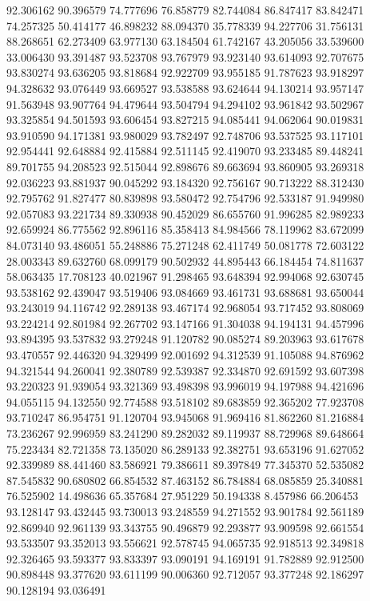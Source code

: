 92.306162
90.396579
74.777696
76.858779
82.744084
86.847417
83.842471
74.257325
50.414177
46.898232
88.094370
35.778339
94.227706
31.756131
88.268651
62.273409
63.977130
63.184504
61.742167
43.205056
33.539600
33.006430
93.391487
93.523708
93.767979
93.923140
93.614093
92.707675
93.830274
93.636205
93.818684
92.922709
93.955185
91.787623
93.918297
94.328632
93.076449
93.669527
93.538588
93.624644
94.130214
93.957147
91.563948
93.907764
94.479644
93.504794
94.294102
93.961842
93.502967
93.325854
94.501593
93.606454
93.827215
94.085441
94.062064
90.019831
93.910590
94.171381
93.980029
93.782497
92.748706
93.537525
93.117101
92.954441
92.648884
92.415884
92.511145
92.419070
93.233485
89.448241
89.701755
94.208523
92.515044
92.898676
89.663694
93.860905
93.269318
92.036223
93.881937
90.045292
93.184320
92.756167
90.713222
88.312430
92.795762
91.827477
80.839898
93.580472
92.754796
92.533187
91.949980
92.057083
93.221734
89.330938
90.452029
86.655760
91.996285
82.989233
92.659924
86.775562
92.896116
85.358413
84.984566
78.119962
83.672099
84.073140
93.486051
55.248886
75.271248
62.411749
50.081778
72.603122
28.003343
89.632760
68.099179
90.502932
44.895443
66.184454
74.811637
58.063435
17.708123
40.021967
91.298465
93.648394
92.994068
92.630745
93.538162
92.439047
93.519406
93.084669
93.461731
93.688681
93.650044
93.243019
94.116742
92.289138
93.467174
92.968054
93.717452
93.808069
93.224214
92.801984
92.267702
93.147166
91.304038
94.194131
94.457996
93.894395
93.537832
93.279248
91.120782
90.085274
89.203963
93.617678
93.470557
92.446320
94.329499
92.001692
94.312539
91.105088
94.876962
94.321544
94.260041
92.380789
92.539387
92.334870
92.691592
93.607398
93.220323
91.939054
93.321369
93.498398
93.996019
94.197988
94.421696
94.055115
94.132550
92.774588
93.518102
89.683859
92.365202
77.923708
93.710247
86.954751
91.120704
93.945068
91.969416
81.862260
81.216884
73.236267
92.996959
83.241290
89.282032
89.119937
88.729968
89.648664
75.223434
82.721358
73.135020
86.289133
92.382751
93.653196
91.627052
92.339989
88.441460
83.586921
79.386611
89.397849
77.345370
52.535082
87.545832
90.680802
66.854532
87.463152
86.784884
68.085859
25.340881
76.525902
14.498636
65.357684
27.951229
50.194338
8.457986
66.206453
93.128147
93.432445
93.730013
93.248559
94.271552
93.901784
92.561189
92.869940
92.961139
93.343755
90.496879
92.293877
93.909598
92.661554
93.533507
93.352013
93.556621
92.578745
94.065735
92.918513
92.349818
92.326465
93.593377
93.833397
93.090191
94.169191
91.782889
92.912500
90.898448
93.377620
93.611199
90.006360
92.712057
93.377248
92.186297
90.128194
93.036491
